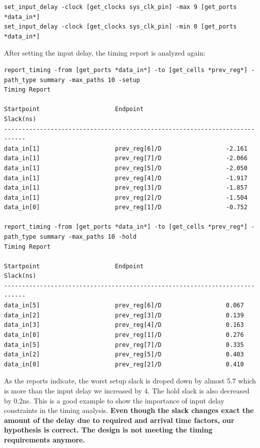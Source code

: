 \documentclass{report}
\begin{document}
\begin{verbatim}
set_input_delay -clock [get_clocks sys_clk_pin] -max 9 [get_ports *data_in*]
set_input_delay -clock [get_clocks sys_clk_pin] -min 0 [get_ports *data_in*]
\end{verbatim}
After setting the input delay, the timing report is analyzed again:
\begin{verbatim}
report_timing -from [get_ports *data_in*] -to [get_cells *prev_reg*] -path_type summary -max_paths 10 -setup
Timing Report

Startpoint                     Endpoint                       Slack(ns)     
----------------------------------------------------------------------------
data_in[1]                     prev_reg[6]/D                  -2.161        
data_in[1]                     prev_reg[7]/D                  -2.066        
data_in[1]                     prev_reg[5]/D                  -2.050        
data_in[1]                     prev_reg[4]/D                  -1.917        
data_in[1]                     prev_reg[3]/D                  -1.857        
data_in[1]                     prev_reg[2]/D                  -1.504        
data_in[0]                     prev_reg[1]/D                  -0.752

report_timing -from [get_ports *data_in*] -to [get_cells *prev_reg*] -path_type summary -max_paths 10 -hold
Timing Report

Startpoint                     Endpoint                       Slack(ns)     
----------------------------------------------------------------------------
data_in[5]                     prev_reg[6]/D                  0.067         
data_in[2]                     prev_reg[3]/D                  0.139         
data_in[3]                     prev_reg[4]/D                  0.163         
data_in[0]                     prev_reg[1]/D                  0.276         
data_in[5]                     prev_reg[7]/D                  0.335         
data_in[2]                     prev_reg[5]/D                  0.403         
data_in[0]                     prev_reg[2]/D                  0.410
\end{verbatim}
As the reports indicate, the worst setup slack is droped down by almost 5.7 which is more than the input delay we increased by 4. The hold slack is also decreased by 0.2ns. This is a good example to show the importance of input delay constraints in the timing analysis.
\textbf{Even though the slack changes exact the amount of the delay due to required and arrival time factors, our hypothesis is correct. The design is not meeting the timing requirements anymore.}
\end{document}
